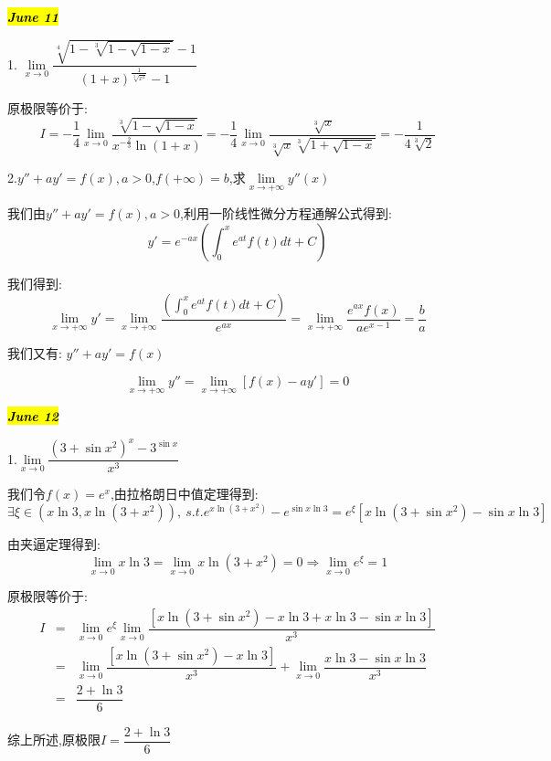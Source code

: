 
\hl{\textbf{\textit{June 11}}}

1. $\lim\limits_{x\rightarrow 0}\dfrac{\sqrt[4]{1-\sqrt[3]{1-\sqrt{1-x}}}-1}{(1+x)^{\frac{1}{\sqrt[3]{x^2}}}-1}$
\begin{solution}
	
	原极限等价于: 
	$$I=-\frac{1}{4}\lim\limits_{x\rightarrow 0}\dfrac{\sqrt[3]{1-\sqrt{1-x}}}{x^{-\frac{2}{3}}\ln(1+x)}=-\frac{1}{4}\lim\limits_{x\rightarrow 0}\dfrac{\sqrt[3]{x}}{\sqrt[3]{x}\sqrt[3]{1+\sqrt{1-x}}}=-\frac{1}{4\sqrt[3]{2}}$$
\end{solution}


2.$y''+ay'=f(x),a>0$,$f(+\infty)=b$,求$\lim\limits_{x\rightarrow +\infty}y''(x)$
\begin{solution}
	
	我们由$y''+ay'=f(x),a>0$,利用一阶线性微分方程通解公式得到: 
	$$y'=e^{-ax}\left(\int_{0}^{x}e^{at}f(t)dt+C \right) $$
	
	我们得到: 
	$$\lim\limits_{x\rightarrow +\infty}y'=\lim\limits_{x\rightarrow +\infty}\dfrac{\left(\int_{0}^{x}e^{at}f(t)dt+C \right)}{e^{ax}}=\lim\limits_{x\rightarrow +\infty}\dfrac{e^{ax}f(x)}{ae^{x-1}}=\dfrac{b}{a}$$
	
	我们又有: $y''+ay'=f(x)$
	
	$$\lim\limits_{x\rightarrow +\infty}y''=\lim\limits_{x\rightarrow +\infty}[f(x)-ay']=0$$
\end{solution}


\hl{\textbf{\textit{June 12}}}

1.$\lim\limits_{x\rightarrow 0}\dfrac{(3+\sin x^2)^{x}-3^{\sin x}}{x^3}$
\begin{solution}
	
	我们令$f(x)=e^x$,由拉格朗日中值定理得到: 
	$$\exists \xi\in(x\ln 3,x\ln(3+x^2)),\ s.t. e^{x\ln(3+x^2)}-e^{\sin x\ln 3}=e^{\xi}[x\ln(3+\sin x^2)-\sin x\ln 3]$$
	
	由夹逼定理得到: 
	$$\lim\limits_{x\rightarrow 0 }x\ln 3=\lim\limits_{x\rightarrow 0 }x\ln(3+x^2)=0\Rightarrow \lim\limits_{x\rightarrow 0 }e^{\xi}=1$$
	
	原极限等价于: 
	\begin{eqnarray*}
		I&=&\lim\limits_{x\rightarrow 0}e^{\xi}\lim\limits_{x\rightarrow 0}\dfrac{[x\ln(3+\sin x^2)-x\ln 3+x\ln 3-\sin x\ln 3]}{x^3}\\
		&=&\lim\limits_{x\rightarrow 0}\dfrac{[x\ln(3+\sin x^2)-x\ln 3]}{x^3}+\lim\limits_{x\rightarrow 0}\dfrac{x\ln 3-\sin x\ln 3}{x^3}\\
		&=&\dfrac{2+\ln 3}{6}
	\end{eqnarray*}
	
	综上所述,原极限$I=\dfrac{2+\ln 3}{6}$
\end{solution}

